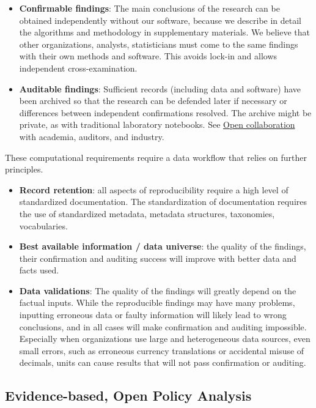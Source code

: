 \documentclass[
  a4paper,
  openany, a4paper, oneside]{book}
\begin{document}
\begin{itemize}
\item
  \textbf{Confirmable findings}: The main conclusions of the research can be obtained independently without our software, because we describe in detail the algorithms and methodology in supplementary materials. We believe that other organizations, analysts, statisticians must come to the same findings with their own methods and software. This avoids lock-in and allows independent cross-examination.
\item
  \textbf{Auditable findings}: Sufficient records (including data and software) have been archived so that the research can be defended later if necessary or differences between independent confirmations resolved. The archive might be private, as with traditional laboratory notebooks. See \protect\hyperlink{opencollaboration}{Open collaboration} with academia, auditors, and industry.
\end{itemize}

These computational requirements require a data workflow that relies on further principles.

\begin{itemize}
\item
  \textbf{Record retention}: all aspects of reproducibility require a high level of standardized documentation. The standardization of documentation requires the use of standardized metadata, metadata structures, taxonomies, vocabularies.
\item
  \textbf{Best available information / data universe}: the quality of the findings, their confirmation and auditing success will improve with better data and facts used.
\item
  \textbf{Data validations}: The quality of the findings will greatly depend on the factual inputs. While the reproducible findings may have many problems, inputting erroneous data or faulty information will likely lead to wrong conclusions, and in all cases will make confirmation and auditing impossible. Especially when organizations use large and heterogeneous data sources, even small errors, such as erroneous currency translations or accidental misuse of decimals, units can cause results that will not pass confirmation or auditing.
\end{itemize}

\hypertarget{opa}{%
\subsection{Evidence-based, Open Policy Analysis}\label{opa}}
\end{document}
